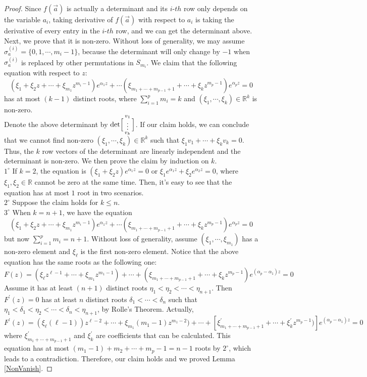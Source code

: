 \begin{proof}Since $f(\vec{a})$ is actually a determinant and its $i$-$th$ row only depends on the variable $a_{i}$, taking derivative of $f(\vec{a})$ with respect to $a_{i}$ is taking the derivative of every entry in the $i$-$th$ row, and we can get the determinant above. Next, we prove that it is non-zero. Without loss of generality, we may assume $\sigma_{a}^{(i)}=\{0,1,\cdots,m_{i}-1\}$, because the determinant will only change by $-1$ when $\sigma_{a}^{(i)}$ is replaced by other permutations in $S_{m_i}$. We claim that the following equation with respect to $z$:
$$(\xi_{1}+\xi_{2}z+\cdots+\xi_{m_1}z^{m_{i}-1})e^{\alpha_{1}z}+\cdots(\xi_{m_{1}+\cdots+m_{p-1}+1}+\cdots+\xi_{k}z^{m_{p}-1})e^{\alpha_{p}z}=0$$ has at most $(k-1)$ distinct roots, where $\sum_{i=1}^{p}m_i=k$ and $(\xi_{1},\cdots,\xi_{k})\in\mathbb{R}^{k}$ is non-zero.\\
Denote the above determinant by $\det\Bigl[\begin{smallmatrix} v_{1}\\\vdots\\ v_{k} \end{smallmatrix}\Bigr]$. If our claim holds, we can conclude that we cannot find non-zero $(\xi_{1},\cdots,\xi_{k})\in\mathbb{R}^{k}$ such that $\xi_{1}v_{1}+\cdots+\xi_{k}v_{k}=0$. Thus, the $k$ row vectors of the determinant are linearly independent and the determinant is non-zero. We then prove the claim by induction on $k$.\\
$1^{\circ}$ If $k=2$, the equation is $(\xi_{1}+\xi_{2}z)e^{\alpha_{1}z}=0$ or $\xi_{1}e^{\alpha_{1}z}+\xi_{2}e^{\alpha_{2}z}=0$, where $\xi_{1},\xi_{2}\in\mathbb{R}$ cannot be zero at the same time. Then, it's easy to see that the equation has at most $1$ root in two scenarios.\\
$2^{\circ}$ Suppose the claim holds for $k\leqslant n$.\\
$3^{\circ}$ When $k=n+1$, we have the equation $$(\xi_{1}+\xi_{2}z+\cdots+\xi_{m_1}z^{m_{i}-1})e^{\alpha_{1}z}+\cdots(\xi_{m_{1}+\cdots+m_{p-1}+1}+\cdots+\xi_{k}z^{m_{p}-1})e^{\alpha_{p}z}=0$$ but now $\sum_{i=1}^{p}m_{i}=n+1$. Without loss of generality, assume $(\xi_{1},\cdots,\xi_{m_{1}})$ has a non-zero element and $\xi_{\ell}$ is the first non-zero element. Notice that the above equation has the same roots as the following one:
$$F(z)=(\xi_{\ell}z^{\ell-1}+\cdots+\xi_{m_1}z^{m_1-1})+\cdots+(\xi_{m_1+\cdots+m_{p-1}+1}+\cdots+\xi_{k}z^{m_{p}-1})e^{(\alpha_{p}-\alpha_{1})z}=0$$
Assume it has at least $(n+1)$ distinct roots $\eta_{1}<\eta_{2}<\cdots<\eta_{n+1}$. Then $F^{\prime}(z)=0$ has at least $n$ distinct roots $\delta_{1}<\cdots<\delta_{n}$ such that $\eta_{1}<\delta_{1}<\eta_{2}<\cdots<\delta_{n}<\eta_{n+1}$, by Rolle's Theorem. Actually, $F^{\prime}(z)=(\xi_{\ell}(\ell-1))z^{\ell-2}+\cdots+\xi_{m_1}(m_1-1)z^{m_{1}-2})+\cdots+[\xi_{m_1+\cdots+m_{p-1}+1}^{\prime}+\cdots+\xi_{k}^{\prime}z^{m_{p}-1})]e^{(\alpha_{p}-\alpha_{1})z}=0$
where $\xi_{m_1+\cdots+m_{p-1}+1}^{\prime}$ and $\xi_{k}^{\prime}$ are coefficients that can be calculated. This equation has at most $(m_1-1)+m_2+\cdots+m_{p}-1=n-1$ roots by $2^{\circ}$, which leads to a contradiction. Therefore, our claim holds and we proved Lemma \ref{NonVanish}.
\end{proof}
